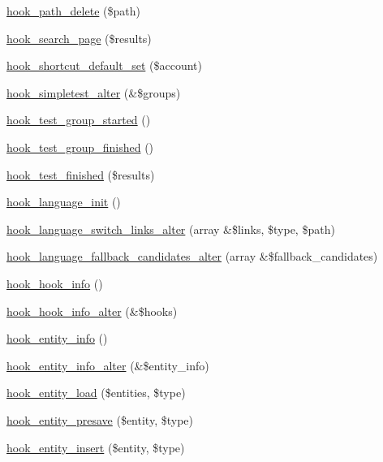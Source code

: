 \begin{DoxyCompactItemize}
\item 
\hyperlink{group__hooks_ga1d7d28de5542f0a6364604ae0b122b7f}{hook\_\-path\_\-delete} (\$path)
\item 
\hyperlink{group__hooks_ga422b9506b3dfd8ed5aa8bfaea98844b9}{hook\_\-search\_\-page} (\$results)
\item 
\hyperlink{group__hooks_ga5fe90af5e2617387b8b14dc51fc356ab}{hook\_\-shortcut\_\-default\_\-set} (\$account)
\item 
\hyperlink{group__hooks_ga0e2bc56b600a923dff7c800e644e0d4d}{hook\_\-simpletest\_\-alter} (\&\$groups)
\item 
\hyperlink{group__hooks_gaf2cec6422b14cc1d0cace3ee2b26de6d}{hook\_\-test\_\-group\_\-started} ()
\item 
\hyperlink{group__hooks_ga9470b40a0a03f248e7cd9a44930c155e}{hook\_\-test\_\-group\_\-finished} ()
\item 
\hyperlink{group__hooks_gaebaf3196cbd4a76ad40603762443e9c5}{hook\_\-test\_\-finished} (\$results)
\item 
\hyperlink{group__hooks_ga6db3413f657addb6ebb32ac7d2561076}{hook\_\-language\_\-init} ()
\item 
\hyperlink{group__hooks_ga77186f4d805f77a8edc3bd8dd6041339}{hook\_\-language\_\-switch\_\-links\_\-alter} (array \&\$links, \$type, \$path)
\item 
\hyperlink{group__hooks_gad5f456f0d7ae7ddc81a0f49ce66fb1a4}{hook\_\-language\_\-fallback\_\-candidates\_\-alter} (array \&\$fallback\_\-candidates)
\item 
\hyperlink{group__hooks_ga65142e7864f445483786087d180a2010}{hook\_\-hook\_\-info} ()
\item 
\hyperlink{group__hooks_gaa02e3983f86b09fc29d5e795fd943cb1}{hook\_\-hook\_\-info\_\-alter} (\&\$hooks)
\item 
\hyperlink{group__hooks_gaf02318e9d0e8cdbf6d187b271b9969a8}{hook\_\-entity\_\-info} ()
\item 
\hyperlink{group__hooks_ga0394a72e4872603e91ce22440195ab45}{hook\_\-entity\_\-info\_\-alter} (\&\$entity\_\-info)
\item 
\hyperlink{group__hooks_ga1f594647c8cbb27f75b77cc4118da8d6}{hook\_\-entity\_\-load} (\$entities, \$type)
\item 
\hyperlink{group__hooks_ga1837f8059e89f6b0c00826f3e06e24f7}{hook\_\-entity\_\-presave} (\$entity, \$type)
\item 
\hyperlink{group__hooks_ga38882255a4252e0e87d77ecd9c75a0dd}{hook\_\-entity\_\-insert} (\$entity, \$type)
\item 

\end{DoxyCompactItemize}
